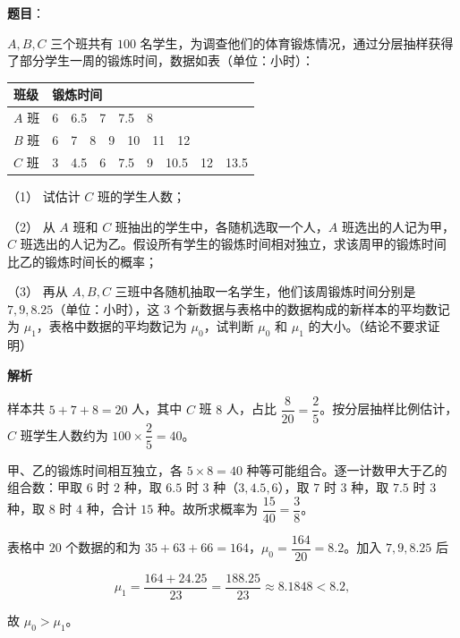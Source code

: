 \begin{answer}

\textbf{题目}：

\(A,B,C\) 三个班共有 \(100\) 名学生，为调查他们的体育锻炼情况，通过分层抽样获得了部分学生一周的锻炼时间，数据如表（单位：小时）：

\begin{center}
\begin{tabular}{ll}
\toprule
班级 & 锻炼时间 \\
\midrule
\(A\) 班 & 6　6.5　7　7.5　8 \\
\(B\) 班 & 6　7　8　9　10　11　12 \\
\(C\) 班 & 3　4.5　6　7.5　9　10.5　12　13.5 \\
\bottomrule
\end{tabular}
\end{center}

（1） 试估计 \(C\) 班的学生人数；

（2） 从 \(A\) 班和 \(C\) 班抽出的学生中，各随机选取一个人，\(A\) 班选出的人记为甲，\(C\) 班选出的人记为乙。假设所有学生的锻炼时间相对独立，求该周甲的锻炼时间比乙的锻炼时间长的概率；

（3） 再从 \(A,B,C\) 三班中各随机抽取一名学生，他们该周锻炼时间分别是 \(7,9,8.25\)（单位：小时），这 \(3\) 个新数据与表格中的数据构成的新样本的平均数记为 \(\mu_{1}\)，表格中数据的平均数记为 \(\mu_{0}\)，试判断 \(\mu_{0}\) 和 \(\mu_{1}\) 的大小。（结论不要求证明）

\textbf{解析}


样本共 \(5+7+8=20\) 人，其中 \(C\) 班 \(8\) 人，占比 \(\dfrac{8}{20}=\dfrac25\)。按分层抽样比例估计，\(C\) 班学生人数约为 \(100\times\dfrac25=40\)。


甲、乙的锻炼时间相互独立，各 \(5\times8=40\) 种等可能组合。逐一计数甲大于乙的组合数：甲取 \(6\) 时 \(2\) 种，取 \(6.5\) 时 \(3\) 种（\(3,4.5,6\)），取 \(7\) 时 \(3\) 种，取 \(7.5\) 时 \(3\) 种，取 \(8\) 时 \(4\) 种，合计 \(15\) 种。故所求概率为 \(\dfrac{15}{40}=\dfrac38\)。


表格中 \(20\) 个数据的和为 \(35+63+66=164\)，\(\mu_0=\dfrac{164}{20}=8.2\)。加入 \(7,9,8.25\) 后

\nopagebreak[4]
\[
\mu_1=\frac{164+24.25}{23}=\frac{188.25}{23}\approx8.1848<8.2,
\]

故 \(\mu_0>\mu_1\)。




\end{answer}
